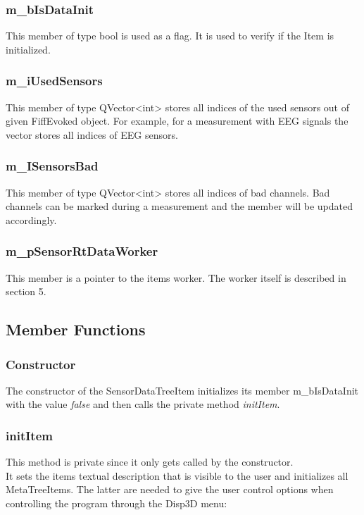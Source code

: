 \subsubsection{m\_bIsDataInit}
This member of type bool is used as a flag. It is used to verify if the Item is initialized.

\subsubsection{m\_iUsedSensors}
This member of type QVector<int> stores all indices of the used sensors out of given FiffEvoked object. For example, for a measurement with EEG signals the vector stores all indices of EEG sensors.

\subsubsection{m\_ISensorsBad}
This member of type QVector<int> stores all indices of bad channels. Bad channels can be marked during a measurement and the member will be updated accordingly.

\subsubsection{m\_pSensorRtDataWorker}
This member is a pointer to the items worker. The worker itself is described in section 5.

\subsection{Member Functions}

\subsubsection{Constructor}

The constructor of the SensorDataTreeItem initializes its member m\_bIsDataInit with the value \textit{false} and then calls the private method \textit{initItem}.

\subsubsection{initItem}

This method is private since it only gets called by the constructor.\\
It sets the items textual description that is visible to the user and initializes all MetaTreeItems. The latter are needed to give the user control options when controlling the program through the Disp3D menu:

